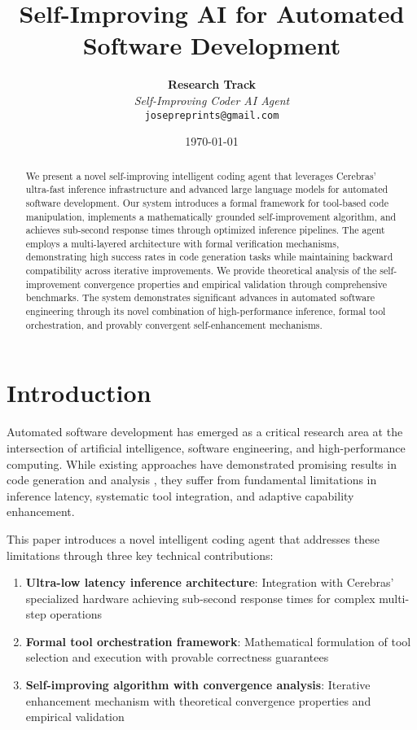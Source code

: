 \documentclass[10pt]{article}
\title{\large \textbf{Self-Improving AI for Automated Software Development}}
\author{
\textbf{Research Track}\\
\textit{Self-Improving Coder AI Agent}\\
\texttt{josepreprints@gmail.com}
}
\date{\today}
\begin{document}
\maketitle

\begin{abstract}
\small
We present a novel self-improving intelligent coding agent that leverages Cerebras' ultra-fast inference infrastructure and advanced large language models for automated software development. Our system introduces a formal framework for tool-based code manipulation, implements a mathematically grounded self-improvement algorithm, and achieves sub-second response times through optimized inference pipelines. The agent employs a multi-layered architecture with formal verification mechanisms, demonstrating high success rates in code generation tasks while maintaining backward compatibility across iterative improvements. We provide theoretical analysis of the self-improvement convergence properties and empirical validation through comprehensive benchmarks. The system demonstrates significant advances in automated software engineering through its novel combination of high-performance inference, formal tool orchestration, and provably convergent self-enhancement mechanisms.
\end{abstract}

\section{Introduction}

Automated software development has emerged as a critical research area at the intersection of artificial intelligence, software engineering, and high-performance computing. While existing approaches have demonstrated promising results in code generation and analysis \cite{chen2021evaluating, wang2021codet5}, they suffer from fundamental limitations in inference latency, systematic tool integration, and adaptive capability enhancement.

This paper introduces a novel intelligent coding agent that addresses these limitations through three key technical contributions:

\begin{enumerate}
    \item \textbf{Ultra-low latency inference architecture}: Integration with Cerebras' specialized hardware achieving sub-second response times for complex multi-step operations
    \item \textbf{Formal tool orchestration framework}: Mathematical formulation of tool selection and execution with provable correctness guarantees
    \item \textbf{Self-improving algorithm with convergence analysis}: Iterative enhancement mechanism with theoretical convergence properties and empirical validation
\end{enumerate}
\end{document}
